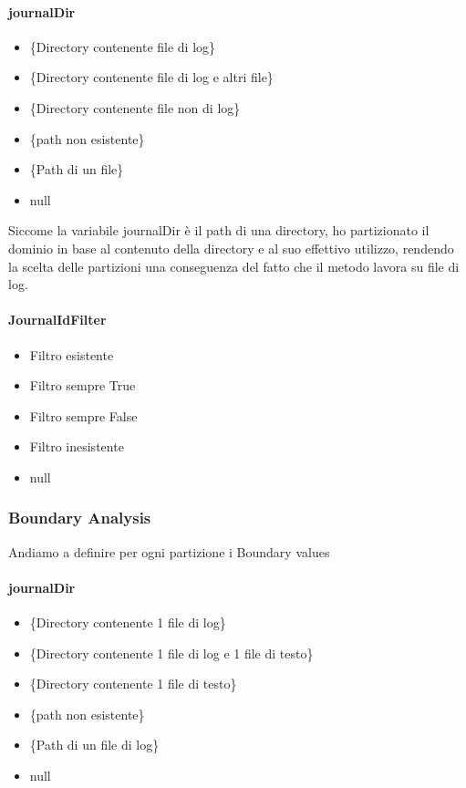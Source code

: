 \documentclass[12pt, a4paper]{article}
\begin{document}
\paragraph{journalDir}
\begin{itemize}
  \item \{Directory contenente file di log\}
  \item \{Directory contenente file di log e altri file\}
  \item \{Directory contenente file non di log\}
  \item \{path non esistente\}
  \item \{Path di un file\}
  \item null
\end{itemize}
Siccome la variabile journalDir è il path di una directory, ho partizionato 
il dominio in base al contenuto della directory e al suo effettivo utilizzo, rendendo la scelta delle partizioni 
una conseguenza del fatto che il metodo lavora su file di log.

\paragraph{JournalIdFilter}
\begin{itemize}
    \item Filtro esistente
    \item Filtro sempre True
    \item Filtro sempre False
    \item Filtro inesistente
    \item null
\end{itemize}

\subsubsection{Boundary Analysis}
Andiamo a definire per ogni partizione i Boundary values

\paragraph{journalDir}
\begin{itemize}
  \item \{Directory contenente 1 file di log\}
  \item \{Directory contenente 1 file di log e 1 file di testo\}
  \item \{Directory contenente 1 file di testo\}
  \item \{path non esistente\}
  \item \{Path di un file di log\}
  \item null
\end{itemize}
\end{document}
